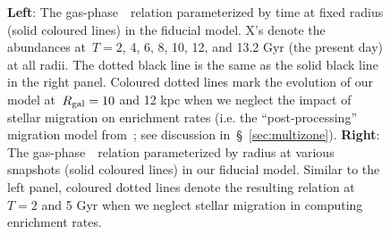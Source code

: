 \documentclass[ms.tex]{subfiles}
\begin{document}
\begin{figure}
\caption{
\textbf{Left}: The gas-phase~\ohno~relation parameterized by time at
fixed radius (solid coloured lines) in the fiducial model. X's denote the
abundances at~$T = 2$, 4, 6, 8, 10, 12, and 13.2 Gyr (the present day) at all
radii.
The dotted black line is the same as the solid black line in the right panel.
Coloured dotted lines mark the evolution of our model at~$R_\text{gal} = 10$ and 12
kpc when we neglect the impact of stellar migration on enrichment rates (i.e.
the ``post-processing'' migration model from~\citealp{Johnson2021}; see
discussion in~\S~\ref{sec:multizone}).
\textbf{Right}: The gas-phase~\ohno~relation parameterized by radius at
various snapshots (solid coloured lines) in our fiducial model.
Similar to the left panel, coloured dotted lines denote the resulting relation
at~$T = 2$ and 5 Gyr when we neglect stellar migration in computing enrichment
rates.
}
\label{fig:no_oh_timeevol}
\end{figure}
\end{document}
